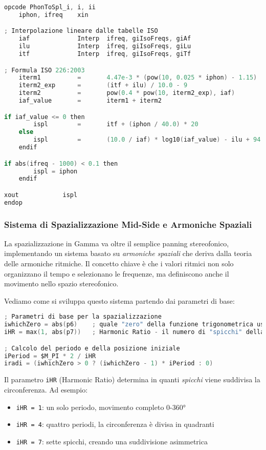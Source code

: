 \begin{lstlisting}[language=C]
opcode PhonToSpl_i, i, ii
    iphon, ifreq    xin

; Interpolazione lineare dalle tabelle ISO
    iaf             Interp  ifreq, giIsoFreqs, giAf
    ilu             Interp  ifreq, giIsoFreqs, giLu
    itf             Interp  ifreq, giIsoFreqs, giTf

; Formula ISO 226:2003
    iterm1          =       4.47e-3 * (pow(10, 0.025 * iphon) - 1.15)
    iterm2_exp      =       (itf + ilu) / 10.0 - 9
    iterm2          =       pow(0.4 * pow(10, iterm2_exp), iaf)
    iaf_value       =       iterm1 + iterm2

if iaf_value <= 0 then
        ispl        =       itf + (iphon / 40.0) * 20
    else
        ispl        =       (10.0 / iaf) * log10(iaf_value) - ilu + 94.0
    endif

if abs(ifreq - 1000) < 0.1 then
        ispl = iphon
    endif

xout            ispl
endop
\end{lstlisting}
\subsubsection{Sistema di Spazializzazione Mid-Side e Armoniche Spaziali}
La spazializzazione in Gamma va oltre il semplice panning stereofonico, implementando un sistema basato su \textit{armoniche spaziali} che deriva dalla teoria delle armoniche ritmiche. Il concetto chiave è che i valori ritmici non solo organizzano il tempo e selezionano le frequenze, ma definiscono anche il movimento nello spazio stereofonico.

Vediamo come si sviluppa questo sistema partendo dai parametri di base:

\begin{lstlisting}[language=C]
; Parametri di base per la spazializzazione
iwhichZero = abs(p6)    ; quale "zero" della funzione trigonometrica usare
iHR = max(1, abs(p7))   ; Harmonic Ratio - il numero di "spicchi" della circonferenza

; Calcolo del periodo e della posizione iniziale
iPeriod = $M_PI * 2 / iHR
iradi = (iwhichZero > 0 ? (iwhichZero - 1) * iPeriod : 0)
\end{lstlisting}

Il parametro \texttt{iHR} (Harmonic Ratio) determina in quanti \textit{spicchi} viene suddivisa la circonferenza. Ad esempio:
\begin{itemize}
    \item \texttt{iHR = 1}: un solo periodo, movimento completo 0-360°
    \item \texttt{iHR = 4}: quattro periodi, la circonferenza è divisa in quadranti
    \item \texttt{iHR = 7}: sette spicchi, creando una suddivisione asimmetrica
\end{itemize}

